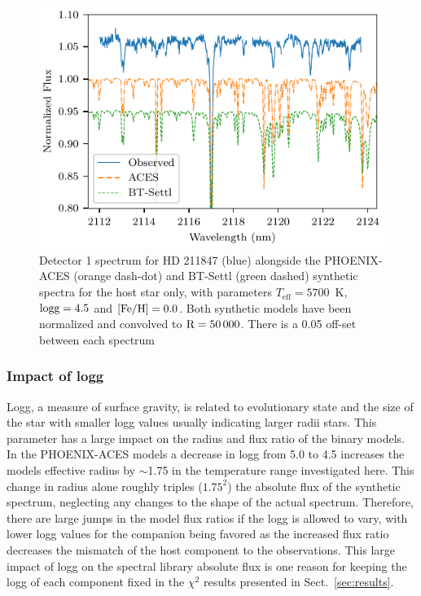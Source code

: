 \documentclass[fleqn,usenatbib]{mnras}
\begin{document}
\begin{figure}
    \centering
    \includegraphics[width=\hsize]{images/HD211847_ACES_BTSettl.pdf}
    \caption{Detector 1 spectrum for {HD 211847} (blue) alongside the PHOENIX-ACES (orange dash-dot) and BT-Settl (green dashed) synthetic spectra for the host star only, with parameters \(T_{\textrm{eff}}=5700\)~K, \(\rm logg=4.5\) and \(\rm [Fe/H]=0.0\). Both synthetic models have been normalized and convolved to \(\rm R=50\,000\). There is a 0.05 off-set between each spectrum}
    \label{fig:hd211847-models}
\end{figure}


\subsubsection{Impact of logg}
\label{subsubsec:logg}
Logg, a measure of surface gravity, is related to evolutionary state and the size of the star with smaller logg values usually indicating larger radii stars. This parameter has a large impact on the radius and flux ratio of the binary models. In the PHOENIX-ACES models a decrease in logg from 5.0 to 4.5 increases the models effective radius by \(\sim\)1.75 in the temperature range investigated here. This change in radius alone roughly triples (\(1.75^2\)) the absolute flux of the synthetic spectrum, neglecting any changes to the shape of the actual spectrum. Therefore, there are large jumps in the model flux ratios if the logg is allowed to vary, with lower logg values for the companion being favored as the increased flux ratio decreases the mismatch of the host component to the observations. This large impact of logg on the spectral library absolute flux is one reason for keeping the logg of each component fixed in the \(\chi^2\) results presented in Sect.~\ref{sec:results}.
\end{document}
